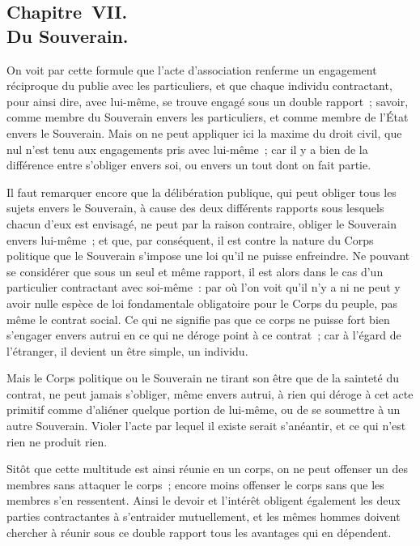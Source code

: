 \documentclass[french,twoside]{book} %
\begin{document}
\subsection[{Chapitre VII. Du Souverain.}]{Chapitre VII. \\
Du Souverain.}
\noindent On voit par cette formule que l’acte d’association renferme un engagement réciproque du publie avec les particuliers, et que chaque individu contractant, pour ainsi dire, avec lui-même, se trouve engagé sous un double rapport ; savoir, comme membre du Souverain envers les particuliers, et comme membre de l’État envers le Souverain. Mais on ne peut appliquer ici la maxime du droit civil, que nul n’est tenu aux engagements pris avec lui-même ; car il y a bien de la différence entre s’obliger envers soi, ou envers un tout dont on fait partie.\par
Il faut remarquer encore que la délibération publique, qui peut obliger tous les sujets envers le Souverain, à cause des deux différents rapports sous lesquels chacun d’eux est envisagé, ne peut par la raison contraire, obliger le Souverain envers lui-même ; et que, par conséquent, il est contre la nature du Corps politique que le Souverain s’impose une loi qu’il ne puisse enfreindre. Ne pouvant se considérer que sous un seul et même rapport, il est alors dans le cas d’un particulier contractant avec soi-même : par où l’on voit qu’il n’y a ni ne peut y avoir nulle espèce de loi fondamentale obligatoire pour le Corps du peuple, pas même le contrat social. Ce qui ne signifie pas que ce corps ne puisse fort bien s’engager envers autrui en ce qui ne déroge point à ce contrat ; car à l’égard de l’étranger, il devient un être simple, un individu.\par
Mais le Corps politique ou le Souverain ne tirant son être que de la sainteté du contrat, ne peut jamais s’obliger, même envers autrui, à rien qui déroge à cet acte primitif comme d’aliéner quelque portion de lui-même, ou de se soumettre à un autre Souverain. Violer l’acte par lequel il existe serait s’anéantir, et ce qui n’est rien ne produit rien.\par
Sitôt que cette multitude est ainsi réunie en un corps, on ne peut offenser un des membres sans attaquer le corps ; encore moins offenser le corps sans que les membres s’en ressentent. Ainsi le devoir et l’intérêt obligent également les deux parties contractantes à s’entraider mutuellement, et les mêmes hommes doivent chercher à réunir sous ce double rapport tous les avantages qui en dépendent.\par
\end{document}
